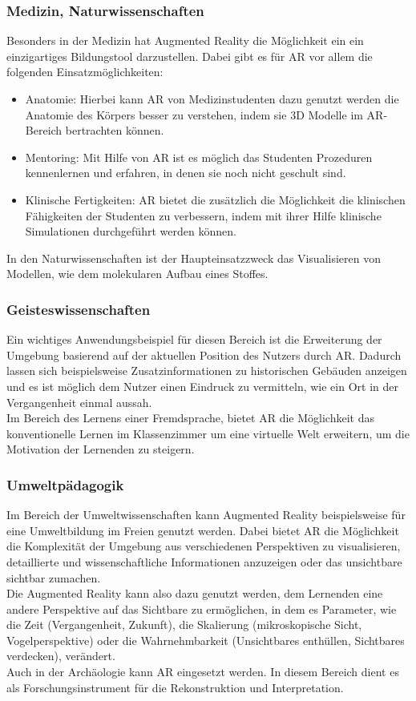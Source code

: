 \subsubsection{Medizin, Naturwissenschaften}
Besonders in der Medizin hat Augmented Reality die Möglichkeit ein ein einzigartiges Bildungstool darzustellen. Dabei gibt es für AR vor allem die folgenden Einsatzmöglichkeiten:
\begin{itemize}
\item Anatomie: Hierbei kann AR von Medizinstudenten dazu genutzt werden die Anatomie des Körpers besser zu verstehen, indem sie 3D Modelle im AR-Bereich bertrachten können.
\item Mentoring: Mit Hilfe von AR ist es möglich das Studenten Prozeduren kennenlernen und erfahren, in denen sie noch nicht geschult sind. 
\item Klinische Fertigkeiten: AR bietet die zusätzlich die Möglichkeit die klinischen Fähigkeiten der Studenten zu verbessern, indem mit ihrer Hilfe klinische Simulationen durchgeführt werden können.
\end{itemize}
In den Naturwissenschaften ist der Haupteinsatzzweck das Visualisieren von Modellen, wie dem molekularen Aufbau eines Stoffes. \citep[Kapitel 7-9]{geroimenko:ar-in-education}

\subsubsection{Geisteswissenschaften}
Ein wichtiges Anwendungsbeispiel für diesen Bereich ist die Erweiterung der Umgebung basierend auf der aktuellen Position des Nutzers  durch AR. Dadurch lassen sich beispielsweise Zusatzinformationen zu historischen Gebäuden anzeigen und es ist möglich dem Nutzer einen Eindruck zu vermitteln, wie ein Ort in der Vergangenheit einmal aussah. \\
Im Bereich des Lernens einer Fremdsprache, bietet AR die Möglichkeit das konventionelle Lernen im Klassenzimmer um eine virtuelle Welt erweitern, um die Motivation der Lernenden zu steigern. \citep[Kapitel 11-12]{geroimenko:ar-in-education}

\subsubsection{Umweltpädagogik}
Im Bereich der Umweltwissenschaften kann Augmented Reality beispielsweise für eine Umweltbildung im Freien genutzt werden. Dabei bietet AR die Möglichkeit die Komplexität der Umgebung aus verschiedenen Perspektiven zu visualisieren, detaillierte und wissenschaftliche Informationen anzuzeigen oder das \glqq unsichtbare\grqq{} sichtbar zumachen. \\
Die Augmented Reality kann also dazu genutzt werden, dem Lernenden eine andere Perspektive auf das Sichtbare zu ermöglichen, in dem es Parameter, wie die Zeit (Vergangenheit, Zukunft), die Skalierung (mikroskopische Sicht, Vogelperspektive) oder die Wahrnehmbarkeit (Unsichtbares enthüllen, Sichtbares verdecken), verändert.\\
Auch in der Archäologie kann AR eingesetzt werden. In diesem Bereich dient es als Forschungsinstrument für die Rekonstruktion und Interpretation. \citep[Kapitel 17]{geroimenko:ar-in-education}

